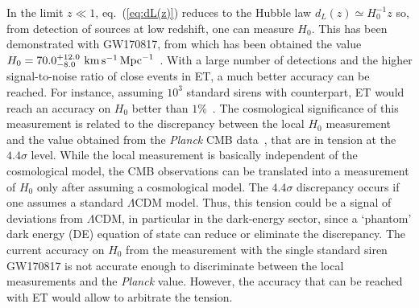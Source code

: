 In the limit $z\ll  1$, eq.~(\ref{eq:dL(z)}) reduces to the Hubble law $d_{L}(z)\simeq H^{-1}_0z$ so, from  detection of sources at low redshift,   one can measure  $H_0$.
This has been demonstrated with  GW170817, from which has been obtained the value $H_0=70.0^{+12.0}_{-8.0}\,\, {\rm km}\, {\rm s}^{-1}\, {\rm Mpc}^{-1}$~\cite{Abbott:2017xzu}.  With a large number of detections and the higher signal-to-noise ratio  of close events in ET, a much better accuracy can be reached. For instance, assuming $10^3$ standard sirens with counterpart, ET would reach an accuracy on $H_0$ better than $1\%$~\cite{Belgacem:2018lbp}.
The cosmological significance of this measurement is related to the discrepancy between the local $H_0$ measurement~\cite{Riess:2016jrr,Riess:2018uxu,Riess:2019cxk} and the value obtained from the {\em Planck} CMB data~\cite{Ade:2015xua}, that are in tension at  the $4.4\sigma$ level. While the local measurement is basically  independent of the cosmological model, the CMB observations can be translated into a measurement  of $H_0$ only after assuming a cosmological model. The $4.4\sigma$ discrepancy occurs if one  assumes a standard  $\Lambda$CDM model. Thus, this tension could be a signal of deviations from 
$\Lambda$CDM, in particular in the dark-energy sector, since a `phantom' dark energy (DE) equation of state can reduce or eliminate the discrepancy. 
The current accuracy on $H_0$ from the measurement with the single standard siren GW170817 is not accurate enough to discriminate between the local measurements and the {\em Planck}  value. However, the accuracy that can be reached with ET would allow to arbitrate the tension.


